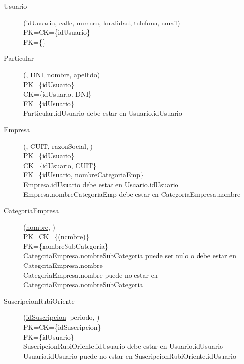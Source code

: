 \begin{description}

 \item[Usuario](\underline{idUsuario}, calle, numero, localidad, telefono, email)\\
PK=CK=\{idUsuario\}\\
FK=\{\}\\

 \item[Particular](\underline{}, DNI, nombre, apellido)\\
PK=\{idUsuario\}\\
CK=\{idUsuario, DNI\}\\
FK=\{idUsuario\}\\
Particular.idUsuario debe estar en Usuario.idUsuario

 \item[Empresa](\underline{}, CUIT, razonSocial, )\\
PK=\{idUsuario\}\\
CK=\{idUsuario, CUIT\}\\
FK=\{idUsuario, nombreCategoriaEmp\}\\
Empresa.idUsuario debe estar en Usuario.idUsuario\\
Empresa.nombreCategoriaEmp debe estar en CategoriaEmpresa.nombre

 \item[CategoriaEmpresa](\underline{nombre}, )\\
PK=CK=\{(nombre)\}\\
FK=\{nombreSubCategoria\}\\
CategoriaEmpresa.nombreSubCategoria puede ser nulo o debe estar en CategoriaEmpresa.nombre\\
CategoriaEmpresa.nombre puede no estar en CategoriaEmpresa.nombreSubCategoria

 \item[SuscripcionRubiOriente](\underline{idSuscripcion}, periodo, )\\
PK=CK=\{idSuscripcion\}\\
FK=\{idUsuario\}\\
SuscripcionRubiOriente.idUsuario debe estar en Usuario.idUsuario\\
Usuario.idUsuario puede no estar en SuscripcionRubiOriente.idUsuario


\end{description}

